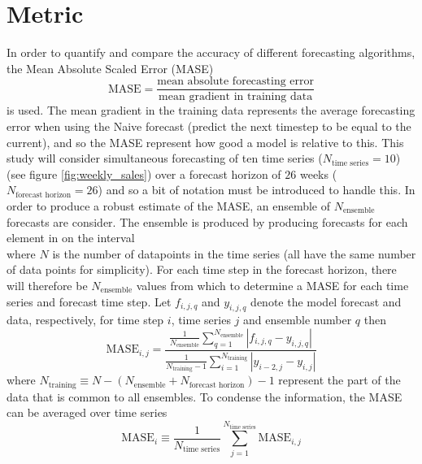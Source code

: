 \section{Metric}
In order to quantify and compare the accuracy of different forecasting algorithms, the Mean Absolute Scaled Error (MASE)
\begin{equation}
	\text{MASE} = \frac{\text{mean absolute forecasting error}}{\text{mean gradient in training data}}
\end{equation}
is used. The mean gradient in the training data represents the average forecasting error when using the Naive forecast (predict the next timestep to be equal to the current), and so the MASE represent how good a model is relative to this. This study will consider simultaneous forecasting of ten time series ($N_{\text{time series}} = 10$) (see figure \ref{fig:weekly_sales}) over a forecast horizon of $26$ weeks ($N_{\text{forecast horizon}} = 26$) and so a bit of notation must be introduced to handle this. In order to produce a robust estimate of the MASE, an ensemble of $N_{\text{ensemble}}$ forecasts are consider. The ensemble is produced by producing forecasts for each element in on the interval
\begin{equation}
	[N-(N_{\text{ensemble}}+N_{\text{forecast horizon}}),N-N_{\text{forecast horizon}}]
\end{equation}
where $N$ is the number of datapoints in the time series (all have the same number of data points for simplicity). For each time step in the forecast horizon, there will therefore be $N_{\text{ensemble}}$ values from which to determine a MASE for each time series and forecast time step. Let $f_{i,j,q}$ and $y_{i,j,q}$ denote the model forecast and data, respectively, for time step $i$, time series $j$ and ensemble number $q$ then
\begin{equation}
	\text{MASE}_{i,j} = \frac{\frac{1}{N_{\text{ensemble}}}\sum_{q = 1}^{N_{\text{ensemble}}}|f_{i,j,q}-y_{i,j,q}|}{\frac{1}{N_{\text{training}}-1}\sum_{i = 1}^{N_{\text{training}}}|y_{i-2,j}-y_{i,j}|}
	\label{eq:MASe}
\end{equation}
where $N_{\text{training}}\equiv N-(N_{\text{ensemble}}+N_{\text{forecast horizon}})-1$ represent the part of the data that is common to all ensembles. To condense the information, the MASE can be averaged over time series
\begin{equation}
	\text{MASE}_i \equiv \frac{1}{N_{\text{time series}}}\sum_{j=1}^{N_{\text{time series}}} \text{MASE}_{i,j}
	\label{eq:MASE_avg_series}
\end{equation}
